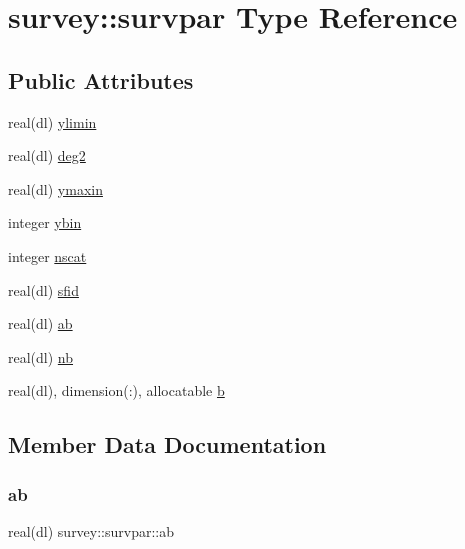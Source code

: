 \hypertarget{structsurvey_1_1survpar}{}\section{survey\+:\+:survpar Type Reference}
\label{structsurvey_1_1survpar}
\subsection*{Public Attributes}
\begin{DoxyCompactItemize}
\item 
real(dl) \mbox{\hyperlink{structsurvey_1_1survpar_a45db02ad2a9d12c01434408d59dbabdd}{ylimin}}
\item 
real(dl) \mbox{\hyperlink{structsurvey_1_1survpar_a7972d602ade0b4089e3f00395a104279}{deg2}}
\item 
real(dl) \mbox{\hyperlink{structsurvey_1_1survpar_a2ff5bdc3dd4c47b0438c235f069e888b}{ymaxin}}
\item 
integer \mbox{\hyperlink{structsurvey_1_1survpar_a046b77768edd065a143e4afe98220fc1}{ybin}}
\item 
integer \mbox{\hyperlink{structsurvey_1_1survpar_af3a998e3ae3e8d483cb2febe53fb51e5}{nscat}}
\item 
real(dl) \mbox{\hyperlink{structsurvey_1_1survpar_a55f269f8bf4e25b25c69074a38605e48}{sfid}}
\item 
real(dl) \mbox{\hyperlink{structsurvey_1_1survpar_a5dcb3d3d51a797049fe5133cf0d3ec44}{ab}}
\item 
real(dl) \mbox{\hyperlink{structsurvey_1_1survpar_a035e4d4d32d7bf5111bc989f81b04647}{nb}}
\item 
real(dl), dimension(\+:), allocatable \mbox{\hyperlink{structsurvey_1_1survpar_ad6cacd3ae89c1e6bd5fc6fb8cc2917cb}{b}}
\end{DoxyCompactItemize}


\subsection{Member Data Documentation}
\mbox{\label{structsurvey_1_1survpar_a5dcb3d3d51a797049fe5133cf0d3ec44}} 
\subsubsection{\texorpdfstring{ab}{ab}}
{\footnotesize\ttfamily real(dl) survey\+::survpar\+::ab}

